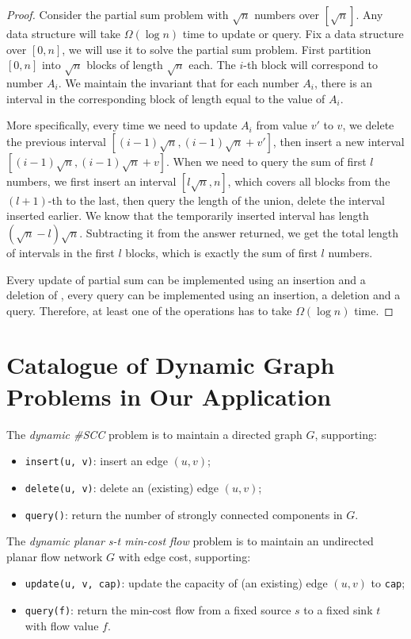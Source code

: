 \documentclass[11pt]{article}
\begin{document}
\begin{proof}
Consider the partial sum problem with $\sqrt{n}$ numbers over $[\sqrt{n}]$. Any data structure will take $\Omega(\log n)$ time to update or query. Fix a \diu{} data structure over $[0, n]$, we will use it to solve the partial sum problem. First partition $[0, n]$ into $\sqrt{n}$ blocks of length $\sqrt{n}$ each. The $i$-th block will correspond to number $A_i$. We maintain the invariant that for each number $A_i$, there is an interval in the corresponding block of length equal to the value of $A_i$. 

More specifically, every time we need to update $A_i$ from value $v'$ to $v$, we delete the previous interval $[(i-1)\sqrt{n},(i-1)\sqrt{n}+v']$, then insert a new interval $[(i-1)\sqrt{n},(i-1)\sqrt{n}+v]$. When we need to query the sum of first $l$ numbers, we first insert an interval $[l\sqrt{n},n]$, which covers all blocks from the $(l+1)$-th to the last, then query the length of the union, delete the interval inserted earlier. We know that the temporarily inserted interval has length $(\sqrt{n}-l)\sqrt{n}$. Subtracting it from the answer returned, we get the total length of intervals in the first $l$ blocks, which is exactly the sum of first $l$ numbers.

Every update of partial sum can be implemented using an insertion and a deletion of \diu{}, every query can be implemented using an insertion, a deletion and a query. Therefore, at least one of the operations has to take $\Omega(\log n)$ time. 
\end{proof}

\section{Catalogue of Dynamic Graph Problems in Our Application}\label{sectcata}

The \emph{dynamic \#SCC} problem is to maintain a directed graph $G$, supporting:
\begin{itemize}
	\item
		\verb+insert(u, v)+: insert an edge $(u, v)$;
	\item
		\verb+delete(u, v)+: delete an (existing) edge $(u, v)$;
	\item
		\verb+query()+: return the number of strongly connected components in $G$.
\end{itemize}

The \emph{dynamic planar s-t min-cost flow} problem is to maintain an undirected planar flow network $G$ with edge cost, supporting:
\begin{itemize}
	\item
		\verb+update(u, v, cap)+: update the capacity of (an existing) edge $(u, v)$ to \verb+cap+;
	\item
		\verb+query(f)+: return the min-cost flow from a fixed source $s$ to a fixed sink $t$ with flow value $f$. 
\end{itemize}
\end{document}
